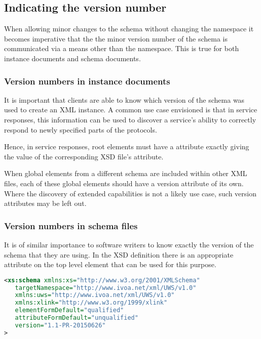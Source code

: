 \documentclass[10pt,a4paper]{ivoa}
\begin{document}
\subsection{Indicating the version number}

When allowing minor changes to the schema without changing the
namespace it becomes imperative that the the minor version number of the schema
is communicated via a means other than the namespace.  This is true for
both instance documents and schema documents.

\subsubsection{Version numbers in instance documents}

It is important that
clients are able to know which version of the schema was used to create an XML
instance.  A common use case envisioned is that in service responses,
this information can be used to discover a service's ability to
correctly respond to newly specified parts of the protocols. 

Hence, in service responses, root elements must have
a 
attribute exactly giving the value of the corresponding XSD file's
 attribute.

When global elements from a different schema are included within other
XML files, each of these global elements should have a version attribute
of its own.  Where the discovery of extended capabilities is not a
likely use case, such version attributes may be left out.

\subsubsection{Version numbers in schema files}
It is of similar importance to software writers to know exactly the version of
the schema that they are using. In the XSD definition there is an appropriate
 attribute on the top level  element that can be
used for this purpose.

\begin{lstlisting}[language=XML]
<xs:schema xmlns:xs="http://www.w3.org/2001/XMLSchema"
   targetNamespace="http://www.ivoa.net/xml/UWS/v1.0"
   xmlns:uws="http://www.ivoa.net/xml/UWS/v1.0"
   xmlns:xlink="http://www.w3.org/1999/xlink" 
   elementFormDefault="qualified"
   attributeFormDefault="unqualified"
   version="1.1-PR-20150626"
>
\end{lstlisting}
\end{document}
